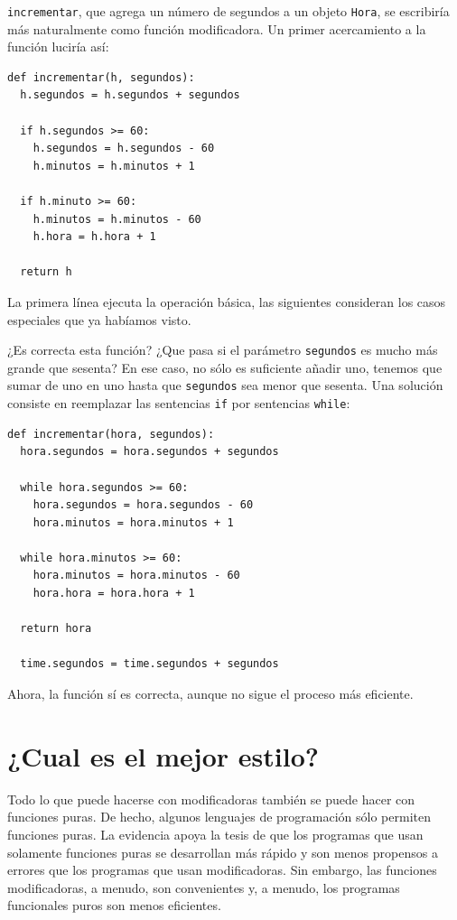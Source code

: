 \texttt{incrementar}, que agrega un número de segundos a un objeto
\texttt{Hora}, se escribiría más naturalmente como función modificadora.
Un primer acercamiento a la función luciría así:
\begin{verbatim}
def incrementar(h, segundos):
  h.segundos = h.segundos + segundos

  if h.segundos >= 60:
    h.segundos = h.segundos - 60
    h.minutos = h.minutos + 1

  if h.minuto >= 60:
    h.minutos = h.minutos - 60
    h.hora = h.hora + 1

  return h
\end{verbatim}

La primera línea ejecuta la operación básica, las siguientes consideran
los casos especiales que ya habíamos visto.

¿Es correcta esta función? ¿Que pasa si el parámetro \texttt{segundos}
es mucho más grande que sesenta? En ese caso, no sólo es suficiente
añadir uno, tenemos que sumar de uno en uno hasta que \texttt{segundos}
sea menor que sesenta. Una solución consiste en reemplazar las sentencias
\texttt{if} por sentencias \texttt{while}:
\begin{verbatim}
def incrementar(hora, segundos):
  hora.segundos = hora.segundos + segundos

  while hora.segundos >= 60:
    hora.segundos = hora.segundos - 60
    hora.minutos = hora.minutos + 1

  while hora.minutos >= 60:
    hora.minutos = hora.minutos - 60
    hora.hora = hora.hora + 1

  return hora

  time.segundos = time.segundos + segundos
\end{verbatim}

Ahora, la función sí es correcta, aunque no sigue el proceso más eficiente.

\section{¿Cual es el mejor estilo?}


Todo lo que puede hacerse con modificadoras también se puede hacer
con funciones puras. De hecho, algunos lenguajes de programación sólo
permiten funciones puras. La evidencia apoya la tesis de que los programas
que usan solamente funciones puras se desarrollan más rápido y son
menos propensos a errores que los programas que usan modificadoras.
Sin embargo, las funciones modificadoras, a menudo, son convenientes
y, a menudo, los programas funcionales puros son menos eficientes.

